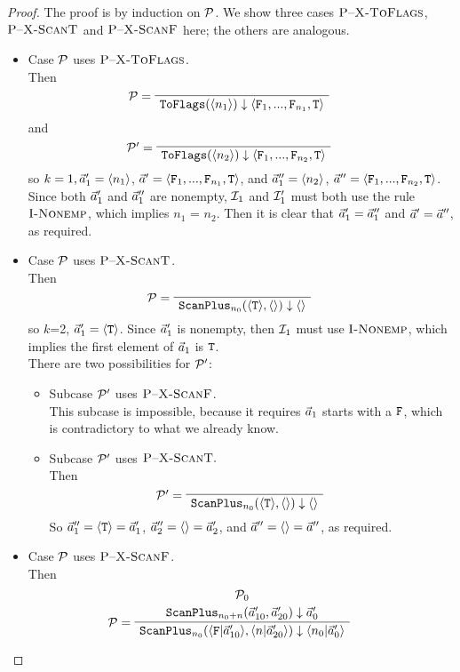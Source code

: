 \begin{proof}
	The proof is by induction on $\mathcal{P}$. We show three cases 
	$\textsc{P--X-ToFlags}$, $\textsc{P--X-ScanT}$ and $\textsc{P--X-ScanF}$ here; the others are analogous.
	\begin{itemize}
		\item Case $\mathcal{P}$ uses $\textsc{P--X-ToFlags}$. \\
		Then
		$$	\PT{\LeLa{\MP =} 
			\Axiom{\blockf{\toflag}{\singl{n_1}}{\< \F_1,...,\F_{n_1},\T \'>}} }
		$$
		and 
		$$	\PT{\LeLa{\MP' =} 
			\Axiom{\blockf{\toflag}{\singl{n_2}}{\< \F_1,...,\F_{n_2},\T \'>}} }
		$$
		so $k=1, \vec a_1' = \langle n_1 \rangle$, $\a' = \< \F_1,...,\F_{n_1},\T \'>$, and  
		$\vec a_1'' = \langle n_2 \rangle$, $\a'' = \< \F_1,...,\F_{n_2},\T \'>$. \\
		Since both $\vec a_1'$ and $\vec a_1''$ are nonempty, $\mathcal{I}_{1}$ and $\mathcal{I}_{1}'$ must both use the rule $\textsc{I-Nonemp}$,
		which implies $n_1$ = $n_2$. 
		Then it is clear that $\vec a_1' = \vec a_1''$ and $\vec a' = \vec a''$, as required. 
		
		\item Case $\mathcal{P}$ uses $\textsc{P--X-ScanT}$. \\
		Then 	
		$$\PT{\LeLa{\MP = } \Axiom{\blockf{\scan_{n_0}}{\oT, \emptyv}{\emptyv}}}$$
		so $k$=2, $\vec a_1' = \langle \mathtt{T} \rangle$. 
		Since $\vec a'_1$ is nonempty, then $\mathcal{I}_{1}$ must use $\textsc{I-Nonemp}$, which implies the first element of $\vec a_1$ is $\mathtt{T}$. \\		
		There are two possibilities for $\mathcal{P}'$:
		\begin{itemize}
			\item Subcase $\mathcal{P}'$ uses $\textsc{P--X-ScanF}$.\\
			This subcase is impossible, because it requires $\vec a_1$ starts with a $\mathtt{F}$, which is contradictory to what we already know.
			
			\item Subcase $\mathcal{P}'$ uses $\textsc{P--X-ScanT}.$ \\
			Then $$\PT{\LeLa{\MP' = } \Axiom{\blockf{\scan_{n_0}}{\oT, \emptyv}{\emptyv}}}$$
			So $\vec a''_1 = \langle \mathtt{T} \rangle = \vec a'_1$, $\vec a''_2 = \langle \rangle = \vec a'_2$, and $\vec a'' = \langle \rangle = \vec a''$, as required. 
			
		\end{itemize}
		
		
		\item Case $\mathcal{P}$ uses $\textsc{P--X-ScanF}$. \\
		Then 
		$$\PT{\UCN{\MP_0}{\blockf{\scan_{n_0+n}}{\a'_{10},\a'_{20}}{\a_0'}}
			\LeLa{\MP = }
			\UC{\blockf{\scan_{n_0}}{\<\F|\a'_{10} \'>, \<n|\a'_{20}\'>}{\<n_0|\a'_0\'>}}
		}$$
	

\end{itemize}
\end{proof}
